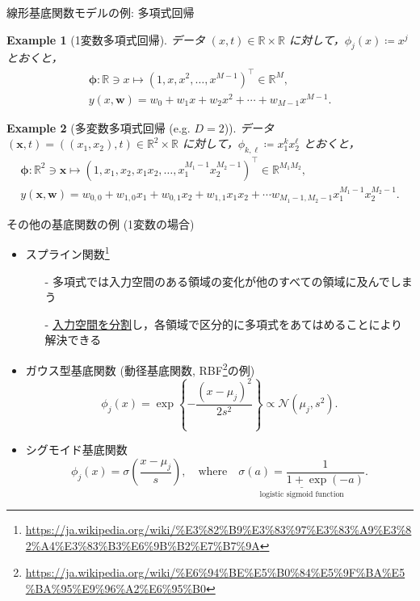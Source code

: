 \documentclass[uplatex,11pt,dvipdfmx,aspectratio=169,unicode,t]{beamer}
\newtheorem{ex}{Example}
\numberwithin{equation}{section}
\newcommand{\BR}{\mathbb{R}}
\newcommand{\CN}{\mathcal{N}}
\newcommand{\bs}[1]{\boldsymbol{#1}}
\newcommand{\1}{\bs{1}}
\newcommand{\0}{\bs{0}}
\begin{document}
\begin{frame}{線形基底関数モデルの例: 多項式回帰}
    \begin{ex}[1変数多項式回帰]
        データ $(x,t) \in \BR \times \BR$ に対して，$\phi_{j}(x) \coloneqq x^{j}$ とおくと，
        \begin{gather}
            \bs{\phi} \colon \BR \ni x \longmapsto (1,x,x^{2},\ldots,x^{M-1})^{\top} \in \BR^{M},\\ 
            y(x,\bs{w}) = w_{0} + w_{1}x + w_{2}x^{2} + \cdots + w_{M-1}x^{M-1}.
        \end{gather}
    \end{ex}
    \begin{ex}[多変数多項式回帰 (e.g. $D=2$)]
        データ $(\bs{x},t) = ((x_{1},x_{2}),t) \in \BR^{2} \times \BR$ に対して，$\phi_{k,\ell} \coloneqq x_{1}^{k}x_{2}^{\ell}$ とおくと，
        \begin{gather}
            \bs{\phi} \colon \BR^{2} \ni \bs{x} \longmapsto (1,x_{1},x_{2},x_{1}x_{2},\ldots,x_{1}^{M_{1}-1}x_{2}^{M_{2}-1})^{\top} \in \BR^{M_{1}M_{2}},\\
            y(\bs{x},\bs{w}) = w_{0,0} + w_{1,0}x_{1} + w_{0,1}x_{2} + w_{1,1}x_{1}x_{2} + \cdots w_{M_{1}-1,M_{2}-1}x_{1}^{M_{1}-1}x_{2}^{M_{2}-1}.
        \end{gather}
    \end{ex}
\end{frame}

\begin{frame}{その他の基底関数の例 (1変数の場合)}
    \begin{itemize}
        \item スプライン関数\footnote{\url{https://ja.wikipedia.org/wiki/\%E3\%82\%B9\%E3\%83\%97\%E3\%83\%A9\%E3\%82\%A4\%E3\%83\%B3\%E6\%9B\%B2\%E7\%B7\%9A}}
        \begin{itemize}
            \item[-] 多項式では入力空間のある領域の変化が他のすべての領域に及んでしまう
            \item[-] \underline{入力空間を分割}し，各領域で区分的に多項式をあてはめることにより解決できる
        \end{itemize}
        \item ガウス型基底関数 (動径基底関数, RBF\footnote{\url{https://ja.wikipedia.org/wiki/\%E6\%94\%BE\%E5\%B0\%84\%E5\%9F\%BA\%E5\%BA\%95\%E9\%96\%A2\%E6\%95\%B0}}の例)
        \begin{equation}
            \phi_{j}(x) = \exp{\left\{-\frac{(x-\mu_{j})^{2}}{2s^{2}}\right\}} \propto \CN(\mu_{j},s^{2}).
        \end{equation}
        \item シグモイド基底関数
        \begin{equation}
            \phi_{j}(x) = \sigma\left(\frac{x-\mu_{j}}{s}\right), \quad \text{where} \quad \underset{\text{logistic sigmoid function}}{\underline{\sigma(a) = \frac{1}{1+\exp(-a)}}}.
        \end{equation}
    \end{itemize}
\end{frame}
\end{document}

